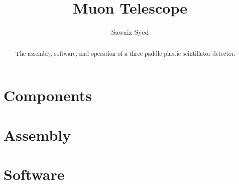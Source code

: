 \documentclass[12pt]{report}
\title{Muon Telescope}
\author{Sawaiz Syed}
\begin{document}
\maketitle 
\tableofcontents{}

\begin{abstract}
    The assembly, software, and operation of a three paddle plastic scintillator detector. 
\end{abstract}

\pagebreak
\chapter{Components}





\chapter{Assembly}

\chapter{Software}





%
%
%
%

\pagebreak
\end{document}
